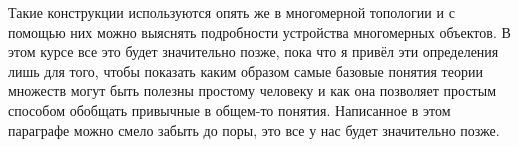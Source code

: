 Такие конструкции используются опять же в многомерной топологии и с помощью них можно выяснять подробности устройства многомерных объектов. В этом курсе все это будет значительно позже, пока что я привёл эти определения лишь для того, чтобы показать каким образом самые базовые понятия теории множеств могут быть полезны простому человеку и как она позволяет простым способом обобщать привычные в общем-то понятия. Написанное в этом параграфе можно смело забыть до поры, это все у нас будет значительно позже.
